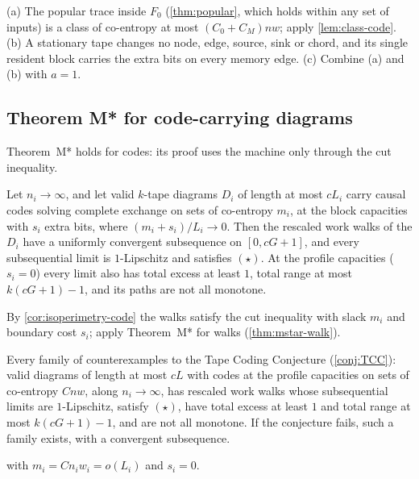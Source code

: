 \begin{outline}
(a) The popular trace inside $F_0$ (\cref{thm:popular}, which holds within any set of inputs) is a
class of co-entropy at most $(C_0+C_M)nw$; apply \cref{lem:class-code}. (b) A stationary tape changes
no node, edge, source, sink or chord, and its single resident block carries the extra bits on every
memory edge. (c) Combine (a) and (b) with $a=1$.
\end{outline}

\subsection{Theorem M* for code-carrying diagrams}

Theorem~M* holds for codes: its proof uses the machine only through the cut inequality.

\begin{theorem}\label{thm:mstar-diagram}
Let $n_i\to\infty$, and let valid $k$-tape diagrams $D_i$ of length at most $cL_i$ carry causal codes
solving complete exchange on sets of co-entropy $m_i$, at the block capacities with $s_i$ extra bits,
where $(m_i+s_i)/L_i\to0$. Then the rescaled work walks of the $D_i$ have a uniformly convergent
subsequence on $[0,cG+1]$, and every subsequential limit is $1$-Lipschitz and satisfies $(\star)$. At
the profile capacities ($s_i=0$) every limit also has total excess at least $1$, total range at most
$k(cG+1)-1$, and its paths are not all monotone.
\end{theorem}

\begin{outline}
By \cref{cor:isoperimetry-code} the walks satisfy the cut inequality with slack $m_i$ and boundary cost
$s_i$; apply Theorem~M* for walks (\cref{thm:mstar-walk}).
\end{outline}

\begin{corollary}\label{cor:cex-star}
Every family of counterexamples to the Tape Coding Conjecture (\cref{conj:TCC}): valid diagrams of
length at most $cL$ with codes at the profile capacities on sets of co-entropy $Cnw$, along
$n_i\to\infty$, has rescaled work walks whose subsequential limits are $1$-Lipschitz, satisfy $(\star)$,
have total excess at least $1$ and total range at most $k(cG+1)-1$, and are not all monotone. If the
conjecture fails, such a family exists, with a convergent subsequence.
\end{corollary}

\begin{outline}
 with $m_i=Cn_iw_i=o(L_i)$ and $s_i=0$.
\end{outline}
